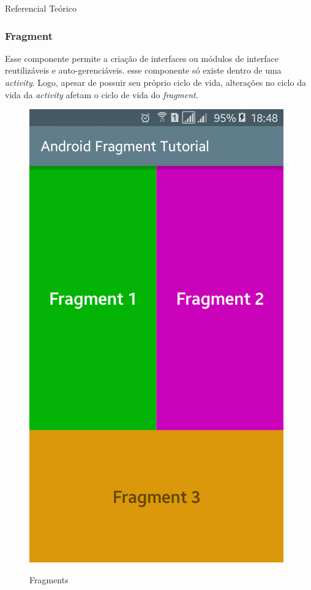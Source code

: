 \documentclass[
	12pt,				%
	openany,			%
	twoside,			%
	a4paper,			%
	english,			%
	french,				%
	spanish,			%
	brazil				%
	]{abntex2}
\begin{document}
\begin{chapter}{Referencial Teórico}
\subsubsection{Fragment} \label{fragment}
Esse componente permite a criação de interfaces ou módulos de interface reutilizáveis e auto-gerenciáveis. esse componente só existe dentro de uma \textit{activity}. Logo, apesar de possuir seu próprio ciclo de vida, alterações no ciclo da vida da \textit{activity} afetam o ciclo de vida do \textit{fragment}.  

\begin{figure}[h]
\centering
   \caption{Fragments}
   \includegraphics[scale=0.4]{media/fragments.png}
     \label{fig:fragments_preview}
\end{figure}


\end{chapter}
\end{document}
